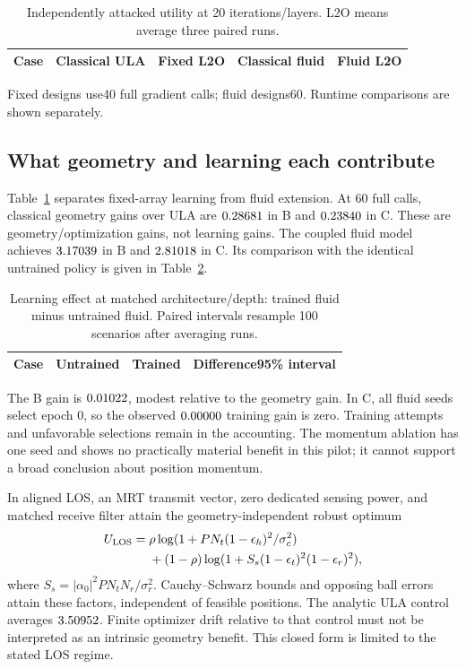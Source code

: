 \documentclass[10pt,journal,onecolumn,draftclsnofoot]{IEEEtran}
\begin{document}
\begin{table}[t]\centering\footnotesize
\caption{Independently attacked utility at 20 iterations/layers. L2O means average three paired runs.}\label{tab:main}
\setlength{\tabcolsep}{3pt}
\begin{tabular}{ccccc}\toprule
Case & Classical ULA & Fixed L2O & Classical fluid & Fluid L2O\\\midrule

\end{tabular}
\par\smallskip\scriptsize Fixed designs use40 full gradient calls; fluid designs60. Runtime comparisons are shown separately.
\end{table}

\subsection{What geometry and learning each contribute}
Table~\ref{tab:main} separates fixed-array learning from fluid extension. At 60 full calls, classical geometry gains over ULA are $0.28681$ in B and $0.23840$ in C. These are geometry/optimization gains, not learning gains. The coupled fluid model achieves $3.17039$ in B and $2.81018$ in C. Its comparison with the identical untrained policy is given in Table~\ref{tab:learning}.

\begin{table}[t]\centering\footnotesize
\caption{Learning effect at matched architecture/depth: trained fluid minus untrained fluid. Paired intervals resample 100 scenarios after averaging runs.}\label{tab:learning}
\setlength{\tabcolsep}{3pt}
\begin{tabular}{cccc}\toprule
Case & Untrained & Trained & Difference95\% interval\\\midrule

\end{tabular}
\end{table}

The B gain is $0.01022$, modest relative to the geometry gain. In C, all fluid seeds select epoch 0, so the observed $0.00000$ training gain is zero. Training attempts and unfavorable selections remain in the accounting. The momentum ablation has one seed and shows no practically material benefit in this pilot; it cannot support a broad conclusion about position momentum.

In aligned LOS, an MRT transmit vector, zero dedicated sensing power, and matched receive filter attain the geometry-independent robust optimum
\begin{align}
 U_{\rm LOS}={}&\rho\log(1+PN_t(1-\epsilon_h)^2/\sigma_c^2)\nonumber\\
 &+(1-\rho)\log(1+S_s(1-\epsilon_t)^2(1-\epsilon_r)^2),\label{eq:los}
\end{align}
where $S_s=|\alpha_0|^2PN_tN_r/\sigma_r^2$. Cauchy--Schwarz bounds and opposing ball errors attain these factors, independent of feasible positions. The analytic ULA control averages $3.50952$. Finite optimizer drift relative to that control must not be interpreted as an intrinsic geometry benefit. This closed form is limited to the stated LOS regime.
\end{document}
